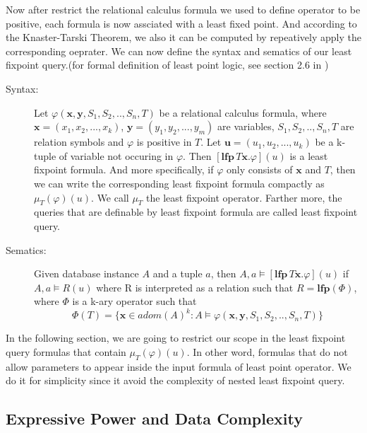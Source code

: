 Now after restrict the relational calculus formula we used to define operator to be positive, each formula is now assciated with a least fixed point. And according to the Knaster-Tarski Theorem, we also it can be computed by repeatively apply the corresponding oeprater. We can now define the syntax and sematics of our least fixpoint query.(for formal definition of least point logic, see section 2.6 in \cite{kolaitis1})\\

\begin{description}

\item[Syntax:]
Let $\varphi(\textbf{x},\textbf{y}, S_1,S_2,..,S_n, T)$ be a relational calculus formula, where $\textbf{x}=(x_1, x_2,...,x_k)$, $\textbf{y}=(y_1,y_2,...,y_m)$ are variables, $S_1,S_2,..,S_n, T$ are relation symbols and $\varphi$ is positive in $T$. Let $\textbf{u}=(u_1, u_2,...,u_k)$ be a k-tuple of variable not occuring in $\varphi$. Then $[\textbf{lfp}\,T\textbf{x}.\varphi](u)$ is a least fixpoint formula. And more specifically, if $\varphi$ only consists of $\textbf{x}$ and $T$, then we can write the corresponding least fixpoint formula compactly as $\mu_T(\varphi)(u)$. We call $\mu_T$ the least fixpoint operator. Farther more, the queries that are definable by least fixpoint formula are called least fixpoint query.\\

\item[Sematics:]
Given database instance $A$ and a tuple $a$, then $A, a \models [\textbf{lfp}\,T\textbf{x}.\varphi](u)$ if $A, a \models R(u)$ where R is interpreted as a relation such that $R=\textbf{lfp}(\Phi)$, where $\Phi$ is a k-ary operator such that
$$ \Phi(T) = \{\textbf{x}\in adom(A)^k: A\models \varphi(\textbf{x},\textbf{y},S_1,S_2,..,S_n,T)\}$$ 

\end{description}

In the following section, we are going to restrict our scope in the least fixpoint query formulas that contain $\mu_T(\varphi)(u)$. In other word, formulas that do not allow parameters to appear inside the input formula of least point operator. We do it for simplicity since it avoid the complexity of nested least fixpoint query.\\ 

\subsection{Expressive Power and Data Complexity}

